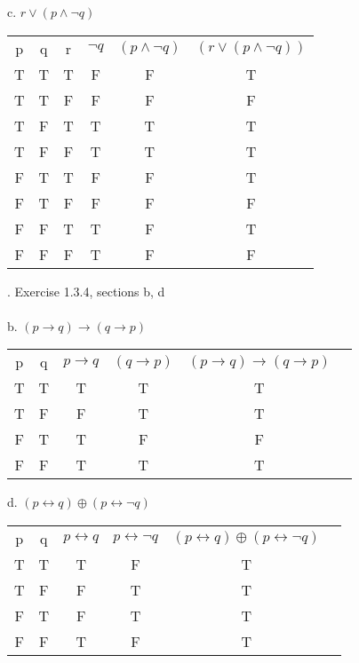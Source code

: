\documentclass[11pt]{article}
\begin{document}
{\noindent c. $ r \vee (p \wedge {\displaystyle \neg } q)$ \\
\begin{center}
\begin{tabular}{ |c|c|c|c|c|c| } 
 \hline
 p & q & r & $ {\displaystyle \neg } q $ & $ (p \wedge {\displaystyle \neg } q) $ & $ (r \vee (p \wedge {\displaystyle \neg } q))$ \\ 
 T & T & T & F & F & T \\ 
 T & T & F & F & F & F\\ 
 T & F & T & T & T  & T\\ 
 T & F & F & T & T & T\\
 F & T & T & F & F & T\\
 F & T & F & F & F & F\\
 F & F & T & T & F & T\\
 F & F & F & T & F & F\\
 \hline
\end{tabular}
\end{center} 


. Exercise 1.3.4, sections b, d \\\\
\noindent b. $(p \rightarrow q) \rightarrow (q \rightarrow p) $\\
\begin{center}
\begin{tabular}{ |c|c|c|c|c|c| } 
 \hline
 p & q & $p \rightarrow q$ & $  (q \rightarrow p) $ & $(p \rightarrow q) \rightarrow (q \rightarrow p) $\\ 
 T & T & T & T & T \\ 
 T & F & F & T & T\\ 
 F & T & T & F & F \\ 
 F & F & T & T & T \\

 \hline
\end{tabular}
\end{center} 

\noindent d. $(p \leftrightarrow q) \oplus (p \leftrightarrow {\displaystyle \neg} q) $\\
\begin{center}
\begin{tabular}{ |c|c|c|c|c|c| } 
 \hline
 p & q & $p \leftrightarrow q$ & $  p \leftrightarrow {\displaystyle \neg} q$ & $(p \leftrightarrow q) \oplus (p \leftrightarrow {\displaystyle \neg} q) $\\ 
 T & T & T & F & T \\ 
 T & F & F & T & T\\ 
 F & T & F & T & T \\ 
 F & F & T & F & T \\


\end{tabular}
\end{center}}
\end{document}
